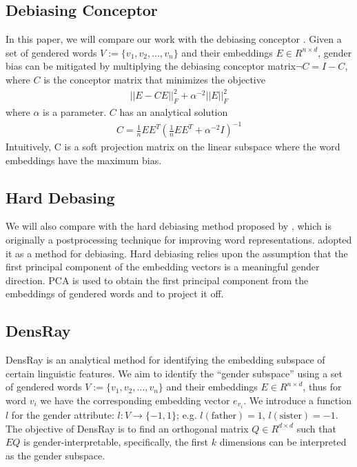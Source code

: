 \subsection{Debiasing Conceptor}
In this paper, we will compare our work with the debiasing conceptor \cite{karve2019conceptor}. Given a set of gendered words $V:=\{v_1,v_2,\dots,v_n\}$ and their embeddings $E \in R^{n\times d}$, gender bias can be mitigated by multiplying the debiasing conceptor matrix$\neg C= I-C$, where $C$ is the conceptor matrix that minimizes the objective
\begin{eqnarray}
||E-CE||^2_F+\alpha^{-2}||E||^2_F
\end{eqnarray}
where $\alpha$ is a parameter. $C$ has an analytical solution
\begin{eqnarray}
C=\frac{1}{n}EE^T(\frac{1}{n}EE^T+\alpha^{-2}I)^{-1}
\end{eqnarray}
Intuitively, C is a soft projection matrix on the linear subspace where the word embeddings have the maximum bias.

\subsection{Hard Debasing}
We will also compare with the hard debiasing method proposed
by , which is originally a postprocessing
technique for improving word
representations.  adopted it as a
method for debiasing. Hard debiasing relies upon
the assumption that the first principal component of the
embedding vectors is a meaningful gender direction. 
PCA is used to obtain the first
principal component from the embeddings of gendered words
and to project it off.

\subsection{DensRay}
DensRay is an analytical method for identifying the
embedding subspace of certain linguistic features. We aim to
identify the ``gender subspace'' using a set of gendered words
$V:=\{v_1,v_2,\dots,v_n\}$ and their embeddings $E \in
R^{n\times d}$, thus for word $v_i$ we have the
corresponding embedding vector $e_{v_i}$. We
introduce a function $l$ for the gender attribute:
$l:V\to \{-1,1\}$;
e.g. $l(\mbox{father})=1$, $l(\mbox{sister})=-1$. The objective of DensRay
is to find an orthogonal matrix $Q\in R^{d\times d}$ such
that $EQ$ is gender-interpretable, specifically, the first
$k$ dimensions can be interpreted as the gender subspace.

